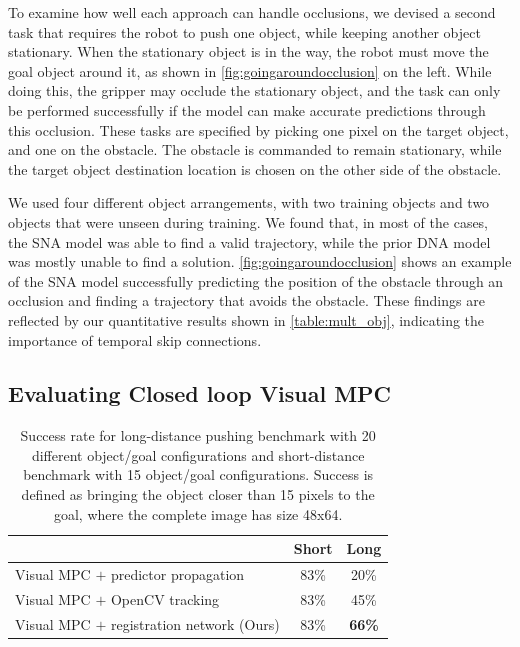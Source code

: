 To examine how well each approach can handle occlusions, we devised a second task that requires the robot to push one object, while keeping another object stationary. When the stationary object is in the way, the robot must move the goal object around it, as shown in \autoref{fig:goingaroundocclusion} on the left. While doing this, the gripper may occlude the stationary object, and the task can only be performed successfully if the model can make accurate predictions through this occlusion. These tasks are specified by picking one pixel on the target object, and one on the obstacle. The obstacle is commanded to remain stationary, while the target object destination location is chosen on the other side of the obstacle.

We used four different object arrangements, with two training objects and two objects that were unseen during training. We found that, in most of the cases, the SNA model was able to find a valid trajectory, while the prior DNA model was mostly unable to find a solution. \autoref{fig:goingaroundocclusion} shows an example of the SNA model successfully predicting the position of the obstacle through an occlusion and finding a trajectory that avoids the obstacle. These findings are reflected by our quantitative results shown in \autoref{table:mult_obj}, indicating the importance of temporal skip connections.

\subsection{Evaluating Closed loop Visual MPC}

\begin{table}
	{\footnotesize
		\begin{center}
			\begin{tabular}{lcc}
				\toprule
				& Short & Long \\
				\midrule
				Visual MPC $+$ predictor propagation  & 83\% & 20\% \\
				Visual MPC $+$ OpenCV tracking  & 83\%  & 45\% \\
				Visual MPC $+$ registration network (Ours)  & 83\% & \textbf{66\%}  \\
				\bottomrule
			\end{tabular}
		\end{center}
	}
	\caption{\footnotesize Success rate for long-distance pushing benchmark with 20 different object/goal configurations and short-distance benchmark with 15 object/goal configurations. Success is defined as bringing the object closer than 15 pixels to the goal, where the complete image has size 48x64.}
	\label{table:res_longd}
	\vspace{-0.35in}
\end{table}



